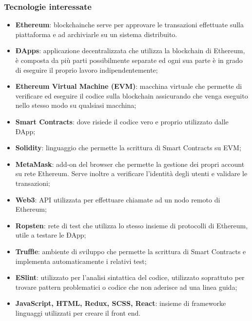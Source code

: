 \subsubsection{Tecnologie interessate}
\begin{itemize}
	\item \textbf{Ethereum}\glo: blockchain\glosp che serve per approvare le transazioni effettuate sulla piattaforma e ad archiviarle su un sistema distribuito. 
	\item \textbf{ÐApps}\glo: applicazione decentralizzata che utilizza la blockchain di Ethereum, è composta da più parti possibilmente separate ed ogni sua parte è in grado di eseguire il proprio lavoro indipendentemente; 
	\item \textbf{Ethereum Virtual Machine (EVM)}\glo: macchina virtuale che permette di verificare ed eseguire il codice sulla blockchain assicurando che venga eseguito nello stesso modo su qualsiasi macchina;
	\item \textbf{Smart Contracts}\glo: dove risiede il codice vero e proprio utilizzato dalle ÐApp;
	\item \textbf{Solidity}: linguaggio che permette la scrittura di Smart Contracts su EVM;
	\item \textbf{MetaMask}\glo: add-on del browser che permette la gestione dei propri account su rete Ethereum. Serve inoltre a verificare l'identità degli utenti e validare le transazioni;
	\item \textbf{Web3}: API utilizzata per effettuare chiamate ad un nodo remoto di Ethereum;
	\item\textbf{Ropsten}: rete di test che utilizza lo stesso insieme di protocolli di Ethereum, utile a testare le ÐApp;
	\item\textbf{Truffle}: ambiente di sviluppo che permette la scrittura di Smart Contracts e implementa automaticamente i relativi test;
	\item\textbf{ESlint}: utilizzato per l'analisi sintattica del codice, utilizzato soprattuto per trovare pattern problematici o codice che non aderisce ad una linea guida;
	\item \textbf{JavaScript, HTML, Redux\glo, SCSS\glo, React\glo}: insieme di framework\glosp e linguaggi utilizzati per creare il front end.
\end{itemize}

